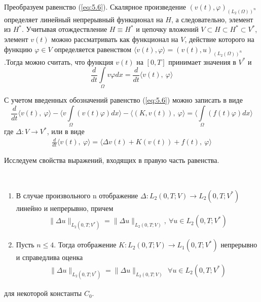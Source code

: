 Преобразуем равенство (\ref{eq:5.6}). Скалярное произведение $(v(t), \varphi)_{(L_2(\Omega))^n}$ определяет линейный непрерывный функционал на $H$, а следовательно,
элемент из $H^\ast$. Учитывая отождествление $H \equiv H^\ast$ и цепочку вложений $V \subset H \subset H^\ast \subset V^\ast$,
элемент $v(t)$ можно рассматривать как функционал на $V$, действие которого на функцию $\varphi \in V$ определяется равенством 
$\langle v(t), \varphi \rangle = (v(t), u)_{(L_2(\Omega))^n}$.Тогда можно считать, что функция $v(t)$ на $[0, T]$ принимает значения в $V^\ast$ и
$$\frac{d}{dt}\int\limits_\Omega v \varphi dx=\frac{d}{dt}\langle v(t), \ \varphi \rangle$$

С учетом введенных обозначений равенство (\ref{eq:5.6}) можно записать в виде
$$\frac{d}{dt} \langle v(t), \ \varphi \rangle - \langle v\int\limits_\Omega(v(t) \varphi)dx \rangle -
\langle (K,v(t)), \ \varphi \rangle = \langle \int\limits_\Omega(f(t) \varphi)dx \rangle $$
где $\Delta: V \rightarrow V^\ast$, или в виде
\begin{equation}\label{eq:5.8}
    \begin{gathered}
        \frac{d}{dt} \langle v(t), \ \varphi \rangle = \langle \Delta v(t)+K(v(t))+f(t), \ \varphi \rangle
    \end{gathered}
\end{equation}

Исследуем свойства выражений, входящих в правую часть равенства.
\begin{lemma} ~\\
    \begin{enumerate} 
        \item В случае произвольного n отображение \linebreak $\Delta: L_2(0, T; V) \rightarrow L_2(0, T; V^\ast)$ линейно и непрерывно, причем
        \begin{equation}\label{eq:5.9}
            \begin{gathered}
                \parallel \Delta u \parallel_{L_2(0, T; V^\ast)} = \parallel \Delta u \parallel_{L_2(0, T; V)}, \ \forall u \in L_2(0, T; V^\ast)
            \end{gathered}
        \end{equation}
        \item Пусть $n \le 4$. Тогда отображение $K: L_2(0, T; V) \rightarrow L_1(0, T; V^\ast)$ непрерывно и справедлива оценка
        \begin{equation}\label{eq:5.10}
            \begin{gathered}
                \parallel \Delta u \parallel_{L_2(0, T; V^\ast)} = \parallel \Delta u \parallel_{L_2(0, T; V)}\, \ \forall u \in L_2(0, T; V^\ast)
            \end{gathered}
        \end{equation}
    \end{enumerate}
    для некоторой константы $C_0$.
\end{lemma}

